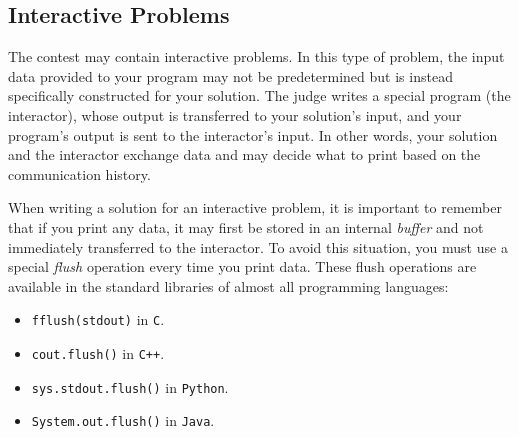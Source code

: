 \subsection*{Interactive Problems}

The contest may contain interactive problems. In this type of problem, the input data provided to your program may not be predetermined but is instead specifically constructed for your solution. The judge writes a special program (the interactor), whose output is transferred to your solution's input, and your program's output is sent to the interactor's input. In other words, your solution and the interactor exchange data and may decide what to print based on the communication history.

When writing a solution for an interactive problem, it is important to remember that if you print any data, it may first be stored in an internal \textit{buffer} and not immediately transferred to the interactor. To avoid this situation, you must use a special \textit{flush} operation every time you print data. These flush operations are available in the standard libraries of almost all programming languages:

\begin{itemize}
	\item \texttt{fflush(stdout)} in \texttt{C}.
	\item \texttt{cout.flush()} in \texttt{C++}.
	\item \texttt{sys.stdout.flush()} in \texttt{Python}.
	\item \texttt{System.out.flush()} in \texttt{Java}.
\end{itemize}
